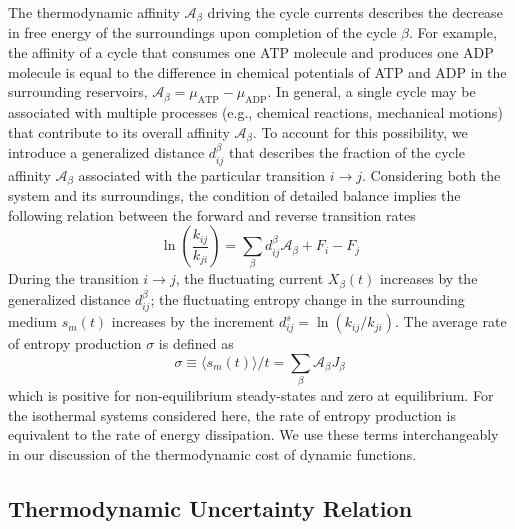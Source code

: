 \begin{appendices}
The thermodynamic affinity $\mathcal{A}_{\beta}$ driving the cycle currents describes the decrease in free energy of the surroundings upon completion of the cycle $\beta$.  For example, the affinity of a cycle that consumes one ATP molecule and produces one ADP molecule is equal to the difference in chemical potentials of ATP and ADP in the surrounding reservoirs, $\mathcal{A}_{\beta}=\mu_{\text{ATP}}-\mu_{\text{ADP}}$.  In general, a single cycle may be associated with multiple processes (e.g., chemical reactions, mechanical motions) that contribute to its overall affinity $\mathcal{A}_{\beta}$.  To account for this possibility, we introduce a generalized distance $d^{\beta}_{ij}$ that describes the fraction of the cycle affinity $\mathcal{A}_{\beta}$ associated with the particular transition $i\rightarrow j$.  Considering both the system and its surroundings, the condition of detailed balance implies the following relation between the forward and reverse transition rates
\begin{equation}
    \ln\left(\frac{k_{ij}}{k_{ji}}\right) = \sum_{\beta} d^{\beta}_{ij} \mathcal{A}_{\beta} + F_i - F_j 
\end{equation}
During the transition $i\rightarrow j$, the fluctuating current $X_{\beta}(t)$ increases by the generalized distance $d^{\beta}_{ij}$; the fluctuating entropy change in the surrounding medium $s_m(t)$ increases by the increment $d^s_{ij} = \ln(k_{ij}/k_{ji})$.  The average rate of entropy production $\sigma$ is defined as 
\begin{equation}
    \sigma \equiv\langle s_m(t)\rangle / t = \sum_{\beta}\mathcal{A}_{\beta} J_{\beta} \label{eq:entropy}
\end{equation}
which is positive for non-equilibrium steady-states and zero at equilibrium.  For the isothermal systems considered here, the rate of entropy production is equivalent to the rate of energy dissipation.  We use these terms interchangeably in our discussion of the thermodynamic cost of dynamic functions.  

\subsection{Thermodynamic Uncertainty Relation}


\end{appendices}
